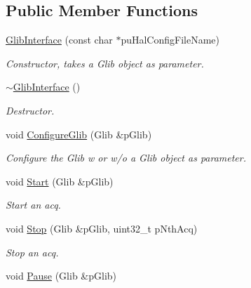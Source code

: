 \subsection*{Public Member Functions}
\begin{DoxyCompactItemize}
\item 
\hyperlink{class_ph2___hw_interface_1_1_glib_interface_a4aebde48748debad7e261c654c2c6fd8}{Glib\-Interface} (const char $\ast$pu\-Hal\-Config\-File\-Name)
\begin{DoxyCompactList}\small\item\em Constructor, takes a Glib object as parameter. \end{DoxyCompactList}\item 
\hypertarget{class_ph2___hw_interface_1_1_glib_interface_a1182c81cb29bca33b23a2c9f662df2ed}{\hyperlink{class_ph2___hw_interface_1_1_glib_interface_a1182c81cb29bca33b23a2c9f662df2ed}{$\sim$\-Glib\-Interface} ()}\label{class_ph2___hw_interface_1_1_glib_interface_a1182c81cb29bca33b23a2c9f662df2ed}

\begin{DoxyCompactList}\small\item\em Destructor. \end{DoxyCompactList}\item 
void \hyperlink{class_ph2___hw_interface_1_1_glib_interface_aad68569190ea9b318b5be1abae4fd23f}{Configure\-Glib} (Glib \&p\-Glib)
\begin{DoxyCompactList}\small\item\em Configure the Glib w or w/o a Glib object as parameter. \end{DoxyCompactList}\item 
void \hyperlink{class_ph2___hw_interface_1_1_glib_interface_a0706eb396293fe5c8c717c5d0ab82165}{Start} (Glib \&p\-Glib)
\begin{DoxyCompactList}\small\item\em Start an acq. \end{DoxyCompactList}\item 
void \hyperlink{class_ph2___hw_interface_1_1_glib_interface_a3073d292371ab4e602900f4276a43b6c}{Stop} (Glib \&p\-Glib, uint32\-\_\-t p\-Nth\-Acq)
\begin{DoxyCompactList}\small\item\em Stop an acq. \end{DoxyCompactList}\item 
\hypertarget{class_ph2___hw_interface_1_1_glib_interface_a1db7815b60c3e3637b23bfa27bab9692}{void \hyperlink{class_ph2___hw_interface_1_1_glib_interface_a1db7815b60c3e3637b23bfa27bab9692}{Pause} (Glib \&p\-Glib)}\label{class_ph2___hw_interface_1_1_glib_interface_a1db7815b60c3e3637b23bfa27bab9692}


\end{DoxyCompactItemize}
